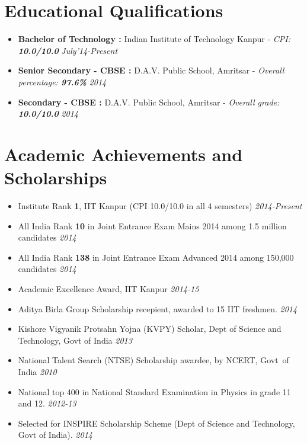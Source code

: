 \documentclass[11pt,a4paper]{moderncv}
\newcommand{\education}[5]{
\item[] \textbf{\large{#1 :}} #2 - \emph{#3: \textbf{#4}} \hfill\textit{#5}
}
\begin{document}
\maketitle
\vspace{-1cm}
\section*{Educational Qualifications}
\begin{itemize}
  \setlength\itemsep{0.2cm}
  \education{Bachelor of Technology}{Indian Institute of Technology Kanpur}{CPI}{10.0/10.0}{July'14-Present}
  \education{Senior Secondary - CBSE}{D.A.V. Public School, Amritsar}{Overall percentage}{97.6\%}{2014}
  \education{Secondary - CBSE}{D.A.V. Public School, Amritsar}{Overall grade}{10.0/10.0}{2014}
\end{itemize}

\vspace{-0.1cm}
\section*{Academic Achievements and Scholarships}
\begin{itemize}
  \setlength\itemsep{0.5em}
\item Institute Rank \textbf{1}, IIT Kanpur (CPI 10.0/10.0 in all 4
  semesters) \hfill \textit{2014-Present}
\item All India Rank \textbf{10} in Joint Entrance Exam Mains 2014 among 1.5 million candidates              \hfill \textit{2014}
\item All India Rank \textbf{138} in Joint Entrance Exam Advanced
  2014 among 150,000 candidates            	\hfill \textit{2014}
\item Academic Excellence Award, IIT Kanpur \hfill \textit{2014-15}
\item Aditya Birla Group Scholarship recepient, awarded to 15 IIT freshmen.                        \hfill \textit{2014}
\item Kishore Vigyanik Protsahn Yojna (KVPY) Scholar, Dept of Science and Technology, Govt of India
  \hfill \textit{2013}
\item National Talent Search (NTSE) Scholarship awardee, by NCERT, Govt\ of India
  \hfill \textit{2010}
\item National top 400 in National Standard Examination in Physics in grade 11 and 12. \hfill \textit{2012-13}
\item Selected for INSPIRE Scholarship Scheme (Dept of Science and Technology, Govt of India).
  \hfill \textit{2014}

\end{itemize}
\end{document}
